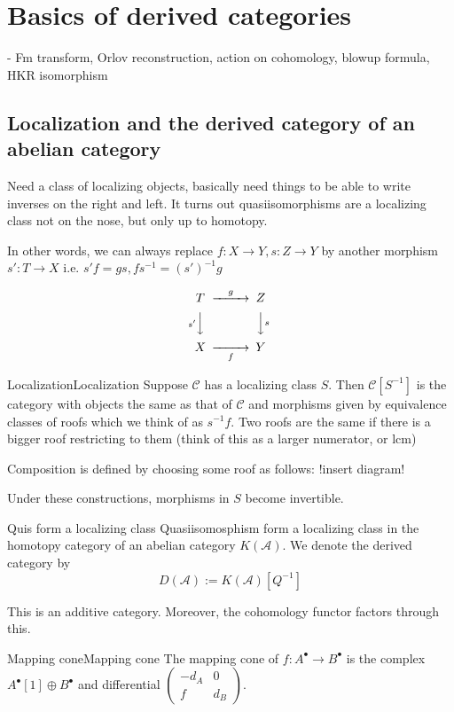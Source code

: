\section{Basics of derived categories}
 - Fm transform, Orlov reconstruction, action on cohomology, blowup formula, HKR isomorphism

\subsection{Localization and the derived category of an abelian category}

Need a class of localizing objects, basically need things to be able to write inverses on the right and left. It turns out quasiisomorphisms are a localizing class not on the nose, but only up to homotopy.

In other words, we can always replace $f:X\rightarrow Y, s:Z\rightarrow Y$ by another morphism $s':T\rightarrow X$ i.e.  $s'f=gs,fs^{-1}=(s')^{-1}g$

$$\begin{CD} T @>g>> Z \\ @Vs'VV @VVsV \\ X @> >f > Y\end{CD}$$

\begin{definition}{Localization}{Localization}
    Suppose $\mathcal{C}$ has a localizing class $S$. Then $\mathcal{C}[S^{-1}]$ is the category with objects the same as that of $\mathcal{C}$ and morphisms given by equivalence classes of roofs which we think of as $s^{-1}f$. Two roofs are the same if there is a bigger roof restricting to them (think of this as a larger numerator, or lcm)
\end{definition}

Composition is defined by choosing some roof as follows: !insert diagram!
 
Under these constructions, morphisms in $S$ become invertible. 

\begin{theorem}{}{Quis form a localizing class}
    Quasiisomosphism form a localizing class in the homotopy category of an abelian category $K(\mathcal{A})$. We denote the derived category by$$D(\mathcal{A}):=K(\mathcal{A})[Q^{-1}]$$
\end{theorem}

This is an additive category. Moreover, the cohomology functor factors through this.

\begin{definition}{Mapping cone}{Mapping cone}
    The mapping cone of $f:A^\bullet\xrightarrow{}B^\bullet$ is the complex $A^\bullet[1]\oplus B^\bullet$ and differential $\begin{pmatrix} -d_A & 0 \\ f & d_B
\end{pmatrix}$.\end{definition}

